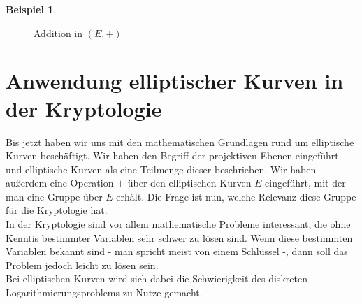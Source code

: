 \documentclass[hidelinks]{article}
\theoremstyle{plain}
\theoremstyle{definition}
\newtheorem{bsp}[thm]{Beispiel}
\theoremstyle{rem}
\begin{document}
\begin{sloppypar}
\begin{bsp}
\begin{figure}[H]
{}
        \caption{Addition in $(E, +)$}
    \end{figure}
\end{bsp}

\section{Anwendung elliptischer Kurven in der Kryptologie}
Bis jetzt haben wir uns mit den mathematischen Grundlagen rund um elliptische Kurven beschäftigt. Wir haben den Begriff der projektiven Ebenen eingeführt und elliptische Kurven als eine Teilmenge dieser beschrieben. 
Wir haben außerdem eine Operation $+$ über den elliptischen Kurven $E$ eingeführt, mit der man eine Gruppe über $E$ erhält.
Die Frage ist nun, welche Relevanz diese Gruppe für die Kryptologie hat. \\
In der Kryptologie sind vor allem mathematische Probleme interessant, die ohne Kenntis bestimmter Variablen sehr schwer zu lösen sind. Wenn diese bestimmten Variablen bekannt sind - man spricht meist von einem Schlüssel -, dann soll das Problem jedoch leicht zu lösen sein. \\
Bei elliptischen Kurven wird sich dabei die Schwierigkeit des diskreten Logarithmierungsproblems zu Nutze gemacht.

\end{sloppypar}
\end{document}
